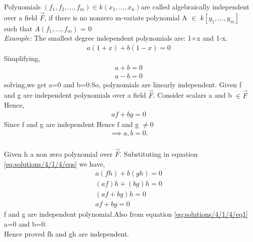Polynomials $(f_1,f_2,\hdots,f_m)\in k(x_1 ,\hdots, x _n)$are called algebraically independent over a field $\vec{F}$, if there is no nonzero m-variate
polynomial A $\in$  $k[y_1 ,\hdots, y_m ]$ such that $A(f_1 ,\hdots , f_m )$ = $0$
\\
{\em Example:}
The smallest degree independent polynomials are:
1+x and 1-x.
\begin{align}
    a(1+x)+b(1-x)=0
\end{align}
Simplifying,
\begin{align}
 a+b=0\\
 a-b=0
\end{align}
solving,we get a=0 and b=0.So, polynomials are linearly independent.
Given f and g are independent polynomials over a field $\vec{F}$.
Consider scalars a and b $\in \vec{F}$
Hence,
\begin{align}\label{eq:solutions/4/1/4/eqs}
    af+bg=0
\end{align}
Since f and g are independent Hence f and g $\neq 0$
\begin{align}\label{eq:solutions/4/1/4/eq1}
\implies a , b=0.
\end{align}\\
Given h a non zero polynomial over $\vec{F}$.
Substituting in equation \eqref{eq:solutions/4/1/4/eqs} we have,
\begin{align}
a(fh)+b(gh)=0\\
(af)h+(bg)h=0\\
(af+bg)h=0\\
af+bg=0
\end{align}
f  and g are independent polynomial.Also from equation \eqref{eq:solutions/4/1/4/eq1} a=0 and b=0.\\
Hence proved fh and gh are independent.

   
   

